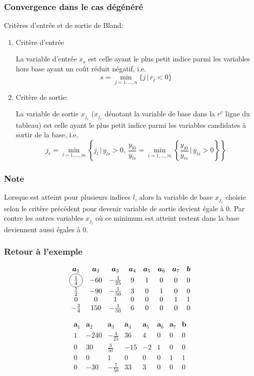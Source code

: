 \documentclass[usepdftitle=false]{beamer}
\newcommand*\circled[1]{\tikz[baseline=(char.base)]{
		\node[shape=circle,draw,inner sep=2pt] (char) {#1};}}
\def\ba{\boldsymbol{a}}
\def\bb{\boldsymbol{b}}
\begin{document}
\begin{frame}
\frametitle{Convergence dans le cas dégénéré}

Critères d'entrée et de sortie de Bland:
\begin{enumerate}
\item
{\color{red}Critère d'entrée}

La variable d'entrée $x_s$ est celle ayant le plus petit indice parmi les variables hors base ayant un coût réduit négatif, i.e.
$$
s = \min_{j = 1,\ldots,n} \{ j \,|\, r_j < 0 \}
$$
\item
{\color{red}Critère de sortie}:

La variable de sortie $x_{j_r}$ ($x_{j_r}$ dénotant la variable de base dans la $r^e$  ligne du tableau) est celle ayant le plus petit indice parmi les variables candidates à sortir de la base, i.e.
$$
j_r = \min_{l = 1,\ldots,m} \left\{ j_l \,|\, y_{ls} > 0,\ 
\frac{y_{l0}}{y_{ls}} = \min_{i = 1,\ldots,m}
\left\{ \frac{y_{i0}}{y_{is}} \,\bigg|\, y_{is} > 0 \right\}
\right\}
$$

\end{enumerate}

\end{frame}

\begin{frame}
\frametitle{Note}

Lorsque
est atteint pour plusieurs indices $l$, alors la variable de base $x_{j_r}$ choisie selon le critère précédent pour devenir variable de sortie devient égale à 0.
Par contre les autres variables $x_{j_l}$ où ce minimum est atteint restent dans la base deviennent aussi égales à 0.

\end{frame}

\begin{frame}
\frametitle{Retour à l'exemple}

\[
\begin{matrix}
\ba_1 & \ba_2 & \ba_3 & \ba_4 & \ba_5 &\ba_6 &\ba_7 & \bb \\
\circled{$\frac{1}{4}$} & -60 & -\frac{1}{25} & 9 & 1 & 0 & 0 & 0 \\
\frac{1}{2} & -90 & -\frac{1}{50} & 3 & 0 & 1 & 0 & 0 \\
0 & 0 & 1 & 0 & 0 & 0 & 1 & 1 \\
-\frac{3}{4} & 150 & -\frac{1}{50} & 6 & 0 & 0 & 0 & 0
\end{matrix}
\]

\[
\begin{matrix}
\ba_1 & \ba_2 & \ba_3 & \ba_4 & \ba_5 &\ba_6 &\ba_7 & \bb \\
1 & -240 & -\frac{4}{25} & 36 & 4 & 0 & 0 & 0 \\
0 & 30 & \frac{3}{50} & -15 & -2 & 1 & 0 & 0 \\
0 & 0 & 1 & 0 & 0 & 0 & 1 & 1 \\
0 & -30 & -\frac{7}{50} & 33 & 3 & 0 & 0 & 0
\end{matrix}
\]

\end{frame}
\end{document}
